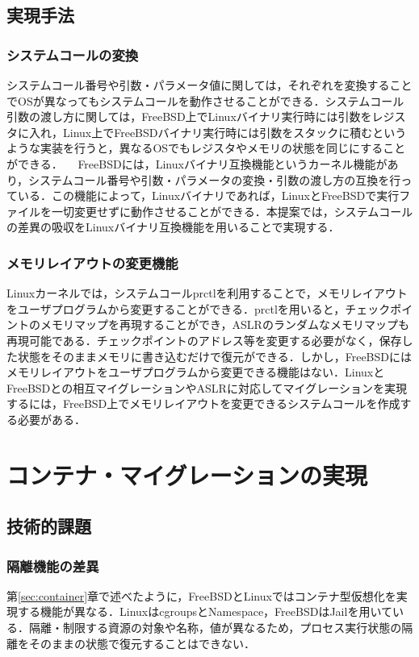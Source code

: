 \documentclass[11pt]{jarticle}
\begin{document}
\subsection{実現手法}
\subsubsection{システムコールの変換}
システムコール番号や引数・パラメータ値に関しては，それぞれを変換することでOSが異なってもシステムコールを動作させることができる．システムコール引数の渡し方に関しては，FreeBSD上でLinuxバイナリ実行時には引数をレジスタに入れ，Linux上でFreeBSDバイナリ実行時には引数をスタックに積むというような実装を行うと，異なるOSでもレジスタやメモリの状態を同じにすることができる．
　FreeBSDには，Linuxバイナリ互換機能\cite{linux-emu}というカーネル機能があり，システムコール番号や引数・パラメータの変換・引数の渡し方の互換を行っている．この機能によって，Linuxバイナリであれば，LinuxとFreeBSDで実行ファイルを一切変更せずに動作させることができる．本提案では，システムコールの差異の吸収をLinuxバイナリ互換機能を用いることで実現する．

\subsubsection{メモリレイアウトの変更機能}
Linuxカーネルでは，システムコールprctlを利用することで，メモリレイアウトをユーザプログラムから変更することができる．prctlを用いると，チェックポイントのメモリマップを再現することができ，ASLRのランダムなメモリマップも再現可能である．チェックポイントのアドレス等を変更する必要がなく，保存した状態をそのままメモリに書き込むだけで復元ができる．しかし，FreeBSDにはメモリレイアウトをユーザプログラムから変更できる機能はない．LinuxとFreeBSDとの相互マイグレーションやASLRに対応してマイグレーションを実現するには，FreeBSD上でメモリレイアウトを変更できるシステムコールを作成する必要がある．

\section{コンテナ・マイグレーションの実現}
\label{sec:CM}
\subsection{技術的課題}
\subsubsection{隔離機能の差異}
第\ref{sec:container}章で述べたように，FreeBSDとLinuxではコンテナ型仮想化を実現する機能が異なる．LinuxはcgroupsとNamespace，FreeBSDはJailを用いている．隔離・制限する資源の対象や名称，値が異なるため，プロセス実行状態の隔離をそのままの状態で復元することはできない．
\end{document}
